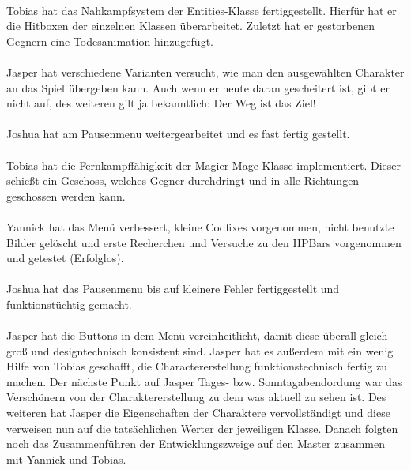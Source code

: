          \\
            Tobias hat das Nahkampfsystem der \glqq Entities\grqq{}-Klasse fertiggestellt.
            Hierfür hat er die Hitboxen der einzelnen Klassen überarbeitet.
            Zuletzt hat er gestorbenen Gegnern eine Todesanimation hinzugefügt.\\

         \\
            Jasper hat verschiedene Varianten versucht, wie man den ausgewählten Charakter an das Spiel übergeben kann. Auch wenn er heute daran gescheitert ist, gibt er nicht auf, des weiteren gilt ja bekanntlich: Der Weg ist das Ziel!\\
           
         \\
            Joshua hat am Pausenmenu weitergearbeitet und es fast fertig gestellt. \\
           
         \\
            Tobias hat die Fernkampffähigkeit der Magier \glqq Mage\grqq{}-Klasse implementiert.
            Dieser schießt ein Geschoss, welches Gegner durchdringt und in alle Richtungen geschossen werden kann.\\

         \\
            Yannick hat das Menü verbessert, kleine Codfixes vorgenommen, nicht benutzte Bilder gelöscht und erste Recherchen und Versuche zu den HPBars vorgenommen und getestet (Erfolglos).\\

         \\
            Joshua hat das Pausenmenu bis auf kleinere Fehler fertiggestellt und funktionstüchtig gemacht.\\
           
         \\
            Jasper hat die Buttons in dem Menü vereinheitlicht, damit diese überall gleich groß und designtechnisch konsistent sind. Jasper hat es außerdem mit ein wenig Hilfe von Tobias geschafft, die Charactererstellung funktionstechnisch fertig zu machen. Der nächste Punkt auf Jasper Tages- bzw. Sonntagabendordung war das Verschönern von der Charaktererstellung zu dem was aktuell zu sehen ist. Des weiteren hat Jasper die Eigenschaften der Charaktere vervollständigt und diese verweisen nun auf die tatsächlichen Werter der jeweiligen Klasse. Danach folgten noch das Zusammenführen der Entwicklungszweige auf den Master zusammen mit Yannick und Tobias.\\
           
